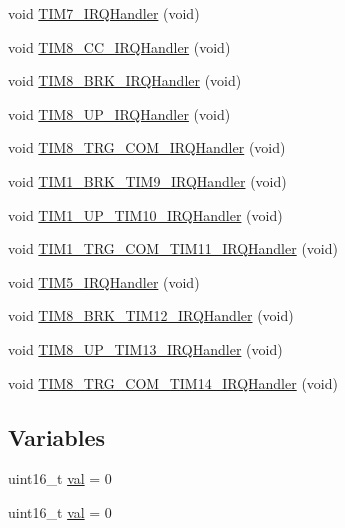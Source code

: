 \begin{DoxyCompactItemize}
\item 
void \hyperlink{group___p_i_o_s___t_i_m_ga98cff83252098363b2dbca9608df964e}{\-T\-I\-M7\-\_\-\-I\-R\-Q\-Handler} (void)
\item 
void \hyperlink{group___p_i_o_s___t_i_m_ga96e44d6fe80524f038da6254514316a4}{\-T\-I\-M8\-\_\-\-C\-C\-\_\-\-I\-R\-Q\-Handler} (void)
\item 
void \hyperlink{group___p_i_o_s___t_i_m_gaa2754c1d099a614d954b4b449fd5ea19}{\-T\-I\-M8\-\_\-\-B\-R\-K\-\_\-\-I\-R\-Q\-Handler} (void)
\item 
void \hyperlink{group___p_i_o_s___t_i_m_ga255e5267ee3275b665940ed1a61ae3ce}{\-T\-I\-M8\-\_\-\-U\-P\-\_\-\-I\-R\-Q\-Handler} (void)
\item 
void \hyperlink{group___p_i_o_s___t_i_m_ga5e1addc9f7d3e0ffa4ed6ca284123043}{\-T\-I\-M8\-\_\-\-T\-R\-G\-\_\-\-C\-O\-M\-\_\-\-I\-R\-Q\-Handler} (void)
\item 
void \hyperlink{group___p_i_o_s___t_i_m_ga3b60f6118cdd3449f4ed29fde4704236}{\-T\-I\-M1\-\_\-\-B\-R\-K\-\_\-\-T\-I\-M9\-\_\-\-I\-R\-Q\-Handler} (void)
\item 
void \hyperlink{group___p_i_o_s___t_i_m_gad1fd361bc5ad89facee67c76d1ff8dc0}{\-T\-I\-M1\-\_\-\-U\-P\-\_\-\-T\-I\-M10\-\_\-\-I\-R\-Q\-Handler} (void)
\item 
void \hyperlink{group___p_i_o_s___t_i_m_ga098245bf4e2f8844b22692b034a266fb}{\-T\-I\-M1\-\_\-\-T\-R\-G\-\_\-\-C\-O\-M\-\_\-\-T\-I\-M11\-\_\-\-I\-R\-Q\-Handler} (void)
\item 
void \hyperlink{group___p_i_o_s___t_i_m_ga5e66446caf21dd90191dc07a13ce2378}{\-T\-I\-M5\-\_\-\-I\-R\-Q\-Handler} (void)
\item 
void \hyperlink{group___p_i_o_s___t_i_m_ga301e0d3520f05f672ce047976f75ff6a}{\-T\-I\-M8\-\_\-\-B\-R\-K\-\_\-\-T\-I\-M12\-\_\-\-I\-R\-Q\-Handler} (void)
\item 
void \hyperlink{group___p_i_o_s___t_i_m_ga7fb516f8826d882ac91cfc093884fcf5}{\-T\-I\-M8\-\_\-\-U\-P\-\_\-\-T\-I\-M13\-\_\-\-I\-R\-Q\-Handler} (void)
\item 
void \hyperlink{group___p_i_o_s___t_i_m_ga4c8359a023f7ede4a9d9f94ea6fb92da}{\-T\-I\-M8\-\_\-\-T\-R\-G\-\_\-\-C\-O\-M\-\_\-\-T\-I\-M14\-\_\-\-I\-R\-Q\-Handler} (void)
\end{DoxyCompactItemize}
\subsection*{\-Variables}
\begin{DoxyCompactItemize}
\item 
uint16\-\_\-t \hyperlink{group___p_i_o_s___t_i_m_ga757344f09097232d715d55cbf9d61a43}{val} = 0
\item 
uint16\-\_\-t \hyperlink{group___p_i_o_s___t_i_m_ga757344f09097232d715d55cbf9d61a43}{val} = 0
\end{DoxyCompactItemize}


